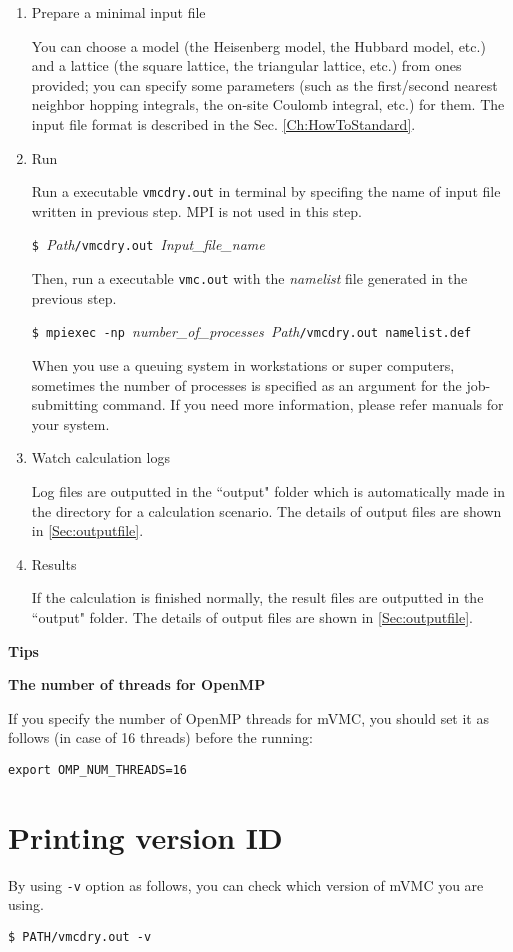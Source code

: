 \begin{enumerate}

\item  Prepare a minimal input file

You can choose a model (the Heisenberg model, the Hubbard model, etc.) and 
a lattice (the square lattice, the triangular lattice, etc.) from ones provided;
you can specify some parameters (such as the first/second nearest neighbor hopping integrals,
the on-site Coulomb integral, etc.) for them.
The input file format is described in the Sec. \ref{Ch:HowToStandard}.

\item  Run

Run a executable \verb|vmcdry.out| in terminal by specifing
the name of input file written in previous step.
MPI is not used in this step.

\verb|$ |\textit{Path}\verb|/vmcdry.out |\textit{Input\_file\_name}

Then, run a executable \verb|vmc.out| with 
the {\it namelist} file generated in the previous step.

\verb|$ mpiexec -np |\textit{number\_of\_processes}\verb| |\textit{Path}\verb|/vmcdry.out namelist.def|

When you use a queuing system in workstations or super computers, 
sometimes the number of processes is specified as an argument for the job-submitting command.
If you need more information, please refer manuals for your system. 

\item Watch calculation logs

Log files are outputted in the ``output" folder which is automatically made in the directory for a calculation scenario.
The details of output files are shown in \ref{Sec:outputfile}.

\item Results

If the calculation is finished normally, the result files are outputted in  the ``output" folder. The details of output files are shown in \ref{Sec:outputfile}.

\end{enumerate}

\begin{screen}
\Large 
{\bf Tips}
\normalsize

{\bf The number of threads for OpenMP}

If you specify the number of OpenMP threads for mVMC,
you should set it as follows (in case of 16 threads) before the running:
\begin{verbatim}
export OMP_NUM_THREADS=16
\end{verbatim}

\end{screen}

\section{Printing version ID}

By using \verb|-v| option as follows, 
you can check which version of mVMC you are using.

\begin{verbatim}
$ PATH/vmcdry.out -v
\end{verbatim}
